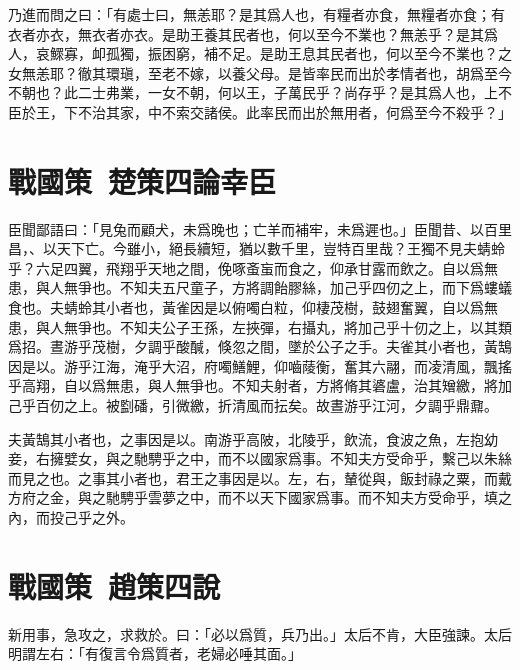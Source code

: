 乃進而問之曰：「有處士曰，無恙耶？是其爲人也，有糧者亦食，無糧者亦食；有衣者亦衣，無衣者亦衣。是助王養其民者也，何以至今不業也？無恙乎？是其爲人，哀鰥寡，卹孤獨，振困窮，補不足。是助王息其民者也，何以至今不業也？之女無恙耶？徹其環瑱，至老不嫁，以養父母。是皆率民而出於孝情者也，胡爲至今不朝也？此二士弗業，一女不朝，何以王，子萬民乎？尚存乎？是其爲人也，上不臣於王，下不治其家，中不索交諸侯。此率民而出於無用者，何爲至今不殺乎？」

\section[莊辛論幸臣\quad{\small 戰國策\ 楚策四}]{{\normalsize 戰國策\ 楚策四}\quad {}論幸臣}
臣聞鄙語曰：「見兔而顧犬，未爲晚也；亡羊而補牢，未爲遲也。」臣聞昔、以百里昌，、以天下亡。今雖小，絕長續短，猶以數千里，豈特百里哉？王獨不見夫蜻蛉乎？六足四翼，飛翔乎天地之間，俛啄蚉䖟而食之，仰承甘露而飲之。自以爲無患，與人無爭也。不知夫五尺童子，方將調飴膠絲，加己乎四仞之上，而下爲螻蟻食也。夫蜻蛉其小者也，黃雀因是以俯噣白粒，仰棲茂樹，鼓翅奮翼，自以爲無患，與人無爭也。不知夫公子王孫，左挾彈，右攝丸，將加己乎十仞之上，以其類爲招。晝游乎茂樹，夕調乎酸醎，倏忽之間，墜於公子之手。夫雀其小者也，黃鵠因是以。游乎江海，淹乎大沼，府噣鱔鯉，仰嚙䔖衡，奮其六翮，而凌清風，飄搖乎高翔，自以爲無患，與人無爭也。不知夫射者，方將脩其碆盧，治其矰繳，將加己乎百仞之上。被㔋磻，引微繳，折清風而抎矣。故晝游乎江河，夕調乎鼎鼐。

夫黃鵠其小者也，之事因是以。南游乎高陂，北陵乎，飲流，食波之魚，左抱幼妾，右擁嬖女，與之馳騁乎之中，而不以國家爲事。不知夫方受命乎，繫己以朱絲而見之也。之事其小者也，君王之事因是以。左，右，輦從與，飯封祿之粟，而戴方府之金，與之馳騁乎雲夢之中，而不以天下國家爲事。而不知夫方受命乎，填之內，而投己乎之外。

\section[觸讋說趙太后\quad{\small 戰國策\ 趙策四}]{{\normalsize 戰國策\ 趙策四}\quad {}說}
新用事，急攻之，求救於。曰：「必以爲質，兵乃出。」太后不肯，大臣強諫。太后明謂左右：「有復言令爲質者，老婦必唾其面。」

